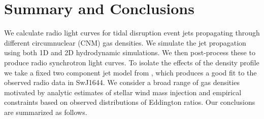 \documentclass[usenatbib,fleqn]{mnras}
\begin{document}




\section{Summary and Conclusions}
\label{sec:conc}

We calculate radio light curves for tidal disruption event jets
propagating through different circumnuclear (CNM) gas densities. We
simulate the jet propagation using both 1D and 2D hydrodynamic
simulations. We then post-process these to produce radio synchrotron
light curves. To isolate the effects of the density profile we take a
fixed two component jet model from \citet{Mimica+2015}, which produces
a good fit to the observed radio data in SwJ1644. We
consider a broad range of gas densities motivated by analytic
estimates of stellar wind mass injection and empirical constraints
based on observed distributions of Eddington ratios. Our conclusions
are summarized as follows.
\end{document}
